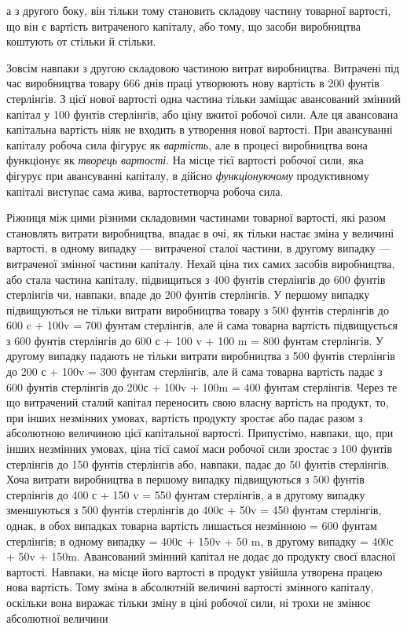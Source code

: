 \parcont{}  %
а з другого боку, він тільки тому становить складову частину
товарної вартості, що він є вартість витраченого капіталу, або
тому, що засоби виробництва коштують от стільки й стільки.

Зовсім навпаки з другою складовою частиною витрат виробництва.
Витрачені під час виробництва товару 666  днів
праці утворюють нову вартість в 200 фунтів стерлінгів. З цієї
нової вартості одна частина тільки заміщає авансований змінний
капітал у 100 фунтів стерлінгів, або ціну вжитої робочої сили.
Але ця авансована капітальна вартість ніяк не входить в утворення
нової вартості. При авансуванні капіталу робоча сила
фігурує як \emph{вартість}, але в процесі виробництва вона функціонує
як \emph{творець вартості}. На місце тієї вартості робочої сили,
яка фігурує при авансуванні капіталу, в дійсно \emph{функціонуючому}
продуктивному капіталі виступає сама жива, вартостетворча робоча
сила.

Ріжниця між цими різними складовими частинами товарної
вартості, які разом становлять витрати виробництва, впадає
в очі, як тільки настає зміна у величині вартості, в одному випадку
— витраченої сталої частини, в другому випадку — витраченої
змінної частини капіталу. Нехай ціна тих самих засобів виробництва,
або стала частина капіталу, підвищиться з 400 фунтів
стерлінгів до 600 фунтів стерлінгів чи, навпаки, впаде до
200 фунтів стерлінгів. У першому випадку підвищуються не
тільки витрати виробництва товару з 500 фунтів стерлінгів до
600 c + 100v = 700 фунтам стерлінгів, але й сама товарна вартість
підвищується з 600 фунтів стерлінгів до 600 с + 100 v + 100 m =
800 фунтам стерлінгів. У другому випадку падають не тільки
витрати виробництва з 500 фунтів стерлінгів до 200 с + 100v =
300 фунтам стерлінгів, але й сама товарна вартість падає з
600 фунтів стерлінгів до 200с + 100v + 100m = 400 фунтам стерлінгів.
Через те що витрачений сталий капітал переносить свою
власну вартість на продукт, то, при інших незмінних умовах, вартість
продукту зростає або падає разом з абсолютною величиною
цієї капітальної вартості. Припустімо, навпаки, що, при
інших незмінних умовах, ціна тієї самої маси робочої сили зростає
з 100 фунтів стерлінгів до 150 фунтів стерлінгів або,
навпаки, падає до 50 фунтів стерлінгів. Хоча витрати виробництва
в першому випадку підвищуються з 500 фунтів стерлінгів
до 400 с + 150 v = 550 фунтам стерлінгів, а в другому випадку
зменшуються з 500 фунтів стерлінгів до 400с + 50v = 450 фунтам
стерлінгів, однак, в обох випадках товарна вартість лишається
незмінною = 600 фунтам стерлінгів; в одному випадку
= 400с + 150v + 50 m, в другому випадку = 400с + 50v + 150m.
Авансований змінний капітал не додає до продукту своєї власної
вартості. Навпаки, на місце його вартості в продукт увійшла утворена
працею нова вартість. Тому зміна в абсолютній величині
вартості змінного капіталу, оскільки вона виражає тільки зміну
в ціні робочої сили, ні трохи не змінює абсолютної величини
\parbreak{}  %
